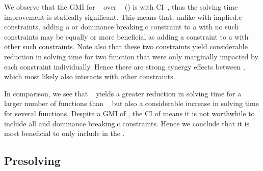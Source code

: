 We observe that the \gls{GMI} for ~\modelD{}
over ~\modelC{}
() is \printGMI{%
  \SolvTechEnableOnlyGoodDomConsPrePlusSolvingTimeSpeedupPrePlusSolvingTimeRegularSpeedupGmean%
} with \gls{CI}~\printGMICI{%
  \SolvTechEnableOnlyGoodDomConsPrePlusSolvingTimeSpeedupPrePlusSolvingTimeRegularSpeedupCiMin%
}{%
  \SolvTechEnableOnlyGoodDomConsPrePlusSolvingTimeSpeedupPrePlusSolvingTimeRegularSpeedupCiMax%
}, thus the solving time improvement is statically significant.
%
This means that, unlike with \gls{implied.c} \glspl{constraint}, adding a
 or \gls{dominance breaking.c} \gls{constraint} to
a  with no such \glspl{constraint} may be equally or
more beneficial as adding a \gls{constraint} to a 
with other such \glspl{constraint}.
%
Note also that these two \glspl{constraint} yield considerable reduction in
solving time for two \gls{function} that were only marginally impacted by each
\gls{constraint} individually.
%
Hence there are strong synergy effects between
, which most likely also interacts with other
\glspl{constraint}.

In comparison, we see that ~\modelF{} yields a
greater reduction in solving time for a larger number of \glspl{function} than
~\modelD{} but also a considerable increase in
solving time for several \glspl{function}.
%
Despite a \gls{GMI} of \printGMI{%
  \SolvTechDisableAllDomConsPrePlusSolvingTimeSpeedupPrePlusSolvingTimeRegularSpeedupGmean%
}, the \gls{CI} of \printGMICI{%
  \SolvTechDisableAllDomConsPrePlusSolvingTimeSpeedupPrePlusSolvingTimeRegularSpeedupCiMin%
}{%
  \SolvTechDisableAllDomConsPrePlusSolvingTimeSpeedupPrePlusSolvingTimeRegularSpeedupCiMax%
} means it is not worthwhile to include all  and
\gls{dominance breaking.c} \glspl{constraint}.
%
Hence we conclude that it is most beneficial to only include
 in the .


\subsection{Presolving}

\def\modelA{\textsc{i}}
\def\modelB{\textsc{ii}}

